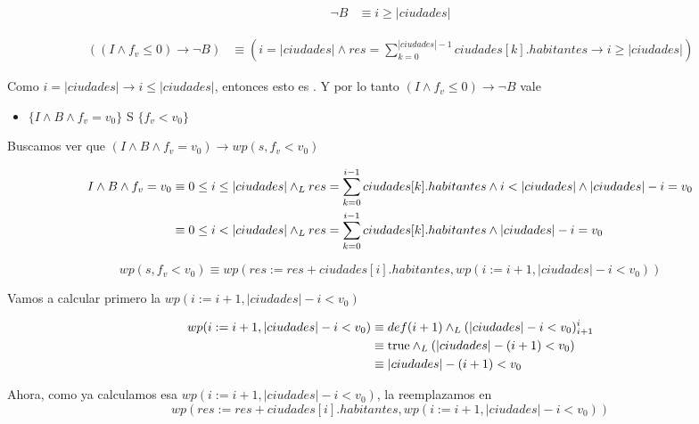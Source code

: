 \documentclass[10pt,a4paper]{article}
\begin{document}
\begin {enumerate}
    \begin{align*}
        \neg B &\equiv i \geq |ciudades|
    \end{align*}


    \begin{align*}
        ((I \land f_{v} \leq 0) \to \neg B) &\equiv (i = |ciudades| \land res = \sum\limits_{k=0}^{|ciudades| -1}{ciudades[k].habitantes} \to i \geq |ciudades|)
    \end{align*}

    Como $i = |ciudades| \to i \leq |ciudades|$, entonces esto es \True . Y por lo tanto $(I \land f_{v} \leq 0) \to \neg B $ vale

    \begin{itemize}
        \item 
            $\{ I \land B \land f_{v} = v_{0}  \}$ S $\{f_{v} < v_{0}\}$
    \end{itemize}
    
    Buscamos ver que  $(I \land B \land f_{v} = v_{0}) \to wp(s, f_{v} < v_{0}) $

    \begin{align*}
        I \land B \land f_{v} = v_{0} &\equiv 0 \leq i \leq |ciudades| \land _L res = \sum\limits_{k=0}^{i - 1}{ciudades[k].habitantes} \land i < |ciudades| \land |ciudades| - i = v_{0} \\
            &\equiv 0 \leq i < |ciudades| \land _L res = \sum\limits_{k=0}^{i - 1}{ciudades[k].habitantes} \land |ciudades| - i = v_{0}
    \end{align*}

    $$wp(s, f_{v}<v_{0}) \equiv  wp(res := res + ciudades[i].habitantes, wp(i := i +1, |ciudades| - i < v_{0}))$$

    Vamos a calcular primero la $wp(i := i +1, |ciudades| - i < v_{0}) $
    
    \begin{align*}
        wp(i := i +1, |ciudades| - i < v_{0}) &\equiv def (i + 1) \land _L (|ciudades| - i < v_{0})_{i + 1}^{i} \\
        &\equiv \mathrm{true} \land _L (|ciudades| - (i + 1) < v_{0}) \\
        &\equiv |ciudades| - (i + 1) < v_{0}
    \end{align*}

    Ahora, como ya calculamos esa $wp(i := i +1, |ciudades| - i < v_{0}) $, la reemplazamos en  \\
    $$ wp(res := res + ciudades[i].habitantes, wp(i := i +1, |ciudades| - i < v_{0}))$$


\end{enumerate}
\end{document}
